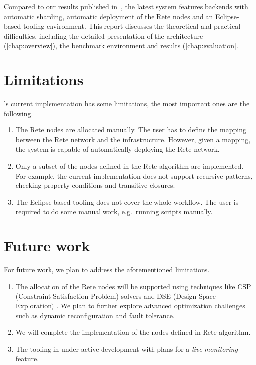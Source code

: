 Compared to our results published in~\cite{Izso:2013:IIG:2487766.2487772}, the latest system features backends with automatic sharding, automatic deployment of the Rete nodes and an Eclipse-based tooling environment. This report discusses the theoretical and practical difficulties, including the detailed presentation of the architecture (\autoref{chap:overview}), the benchmark environment and results (\autoref{chap:evaluation}.

\section{Limitations}

\iqd{}'s current implementation has some limitations, the most important ones are the following.

\begin{enumerate}
  \item The Rete nodes are allocated manually. The user has to define the mapping between the Rete network and the infrastructure. However, given a mapping, the system is capable of automatically deploying the Rete network.
  \item Only a subset of the nodes defined in the Rete algorithm are implemented. For example, the current implementation does not support recursive patterns, checking property conditions and transitive closures.
  \item The Eclipse-based tooling does not cover the whole workflow. The user is required to do some manual work, e.g.\ running scripts manually.
\end{enumerate}

\section{Future work}
\label{future-work}

For future work, we plan to address the aforementioned limitations.

\begin{enumerate}
  \item The allocation of the Rete nodes will be supported using techniques like CSP (Constraint Satisfaction Problem) solvers and DSE (Design Space Exploration) \cite{DSE11}. We plan to further explore advanced optimization challenges such as dynamic reconfiguration and fault tolerance.
  \item We will complete the implementation of the nodes defined in Rete algorithm.
  \item The tooling in under active development with plans for a \emph{live monitoring} feature.
\end{enumerate}

